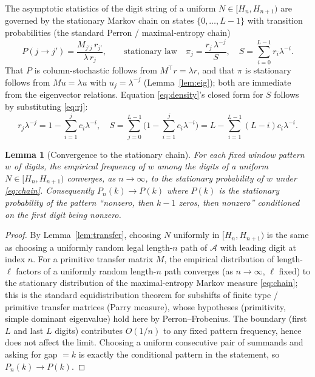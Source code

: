 \documentclass[12pt]{article}
\newtheorem{lemma}{Lemma}
\theoremstyle{definition}
\begin{document}
The asymptotic statistics of the digit string of a uniform $N\in[H_n,H_{n+1})$
are governed by the stationary Markov chain on states $\{0,\dots,L-1\}$ with
transition probabilities (the standard Perron / maximal-entropy chain)
\begin{equation}\label{eq:chain}
P(j\to j')=\frac{M_{j'j}\,r_{j'}}{\lambda\,r_j},
\qquad\text{stationary law}\quad
\pi_j=\frac{r_j\,\lambda^{-j}}{S},\quad S=\sum_{i=0}^{L-1}r_i\lambda^{-i}.
\end{equation}
That $P$ is column-stochastic follows from $M^{\!\top}r=\lambda r$, and that
$\pi$ is stationary follows from $Mu=\lambda u$ with $u_j=\lambda^{-j}$
(Lemma~\ref{lem:eig}); both are immediate from the eigenvector relations.
Equation \eqref{eq:density}'s closed form for $S$ follows by substituting
\eqref{eq:rj}:
\[
r_j\lambda^{-j}=1-\sum_{i=1}^{j}c_i\lambda^{-i},\quad
S=\sum_{j=0}^{L-1}\Big(1-\sum_{i=1}^{j}c_i\lambda^{-i}\Big)
 =L-\sum_{i=1}^{L-1}(L-i)c_i\lambda^{-i}.
\]

\begin{lemma}[Convergence to the stationary chain]\label{lem:conv}
For each fixed window pattern $w$ of digits, the empirical frequency of $w$ among
the digits of a uniform $N\in[H_n,H_{n+1})$ converges, as $n\to\infty$, to the
stationary probability of $w$ under \eqref{eq:chain}. Consequently
$P_n(k)\to P(k)$ where $P(k)$ is the stationary probability of the pattern
``nonzero, then $k-1$ zeros, then nonzero'' conditioned on the first digit being
nonzero.
\end{lemma}

\begin{proof}
By Lemma~\ref{lem:transfer}, choosing $N$ uniformly in $[H_n,H_{n+1})$ is the
same as choosing a uniformly random legal length-$n$ path of $\mathcal A$ with
leading digit at index $n$. For a primitive transfer matrix $M$, the empirical
distribution of length-$\ell$ factors of a uniformly random length-$n$ path
converges (as $n\to\infty$, $\ell$ fixed) to the stationary distribution of the
maximal-entropy Markov measure \eqref{eq:chain}; this is the standard
equidistribution theorem for subshifts of finite type / primitive transfer
matrices (Parry measure), whose hypotheses (primitivity, simple dominant
eigenvalue) hold here by Perron--Frobenius. The boundary (first $L$ and last $L$
digits) contributes $O(1/n)$ to any fixed pattern frequency, hence does not
affect the limit. Choosing a uniform consecutive pair of summands and asking for
gap $=k$ is exactly the conditional pattern in the statement, so
$P_n(k)\to P(k)$.
\end{proof}
\end{document}
